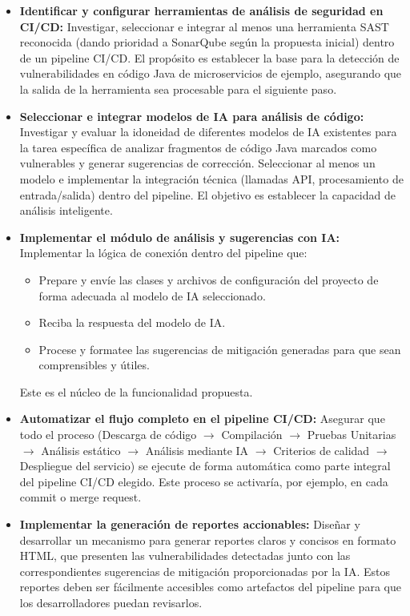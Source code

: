 \begin{itemize}
    \item \textbf{Identificar y configurar herramientas de análisis de seguridad en CI/CD:} Investigar, seleccionar e integrar al menos una herramienta SAST reconocida (dando prioridad a SonarQube según la propuesta inicial) dentro de un pipeline CI/CD. El propósito es establecer la base para la detección de vulnerabilidades en código Java de microservicios de ejemplo, asegurando que la salida de la herramienta sea procesable para el siguiente paso.
    
    \item \textbf{Seleccionar e integrar modelos de IA para análisis de código:} Investigar y evaluar la idoneidad de diferentes modelos de IA existentes para la tarea específica de analizar fragmentos de código Java marcados como vulnerables y generar sugerencias de corrección. Seleccionar al menos un modelo e implementar la integración técnica (llamadas API, procesamiento de entrada/salida) dentro del pipeline. El objetivo es establecer la capacidad de análisis inteligente.
    
    \item \textbf{Implementar el módulo de análisis y sugerencias con IA:} Implementar la lógica de conexión dentro del pipeline que:
    \begin{itemize}
        \item Prepare y envíe las clases y archivos de configuración del proyecto de forma adecuada al modelo de IA seleccionado.
        \item Reciba la respuesta del modelo de IA.
        \item Procese y formatee las sugerencias de mitigación generadas para que sean comprensibles y útiles.
    \end{itemize}
    Este es el núcleo de la funcionalidad propuesta.
    
    \item \textbf{Automatizar el flujo completo en el pipeline CI/CD:} Asegurar que todo el proceso (Descarga de código $\rightarrow$ Compilación $\rightarrow$ Pruebas Unitarias $\rightarrow$ Análisis estático $\rightarrow$ Análisis mediante IA $\rightarrow$ Criterios de calidad $\rightarrow$ Despliegue del servicio) se ejecute de forma automática como parte integral del pipeline CI/CD elegido. Este proceso se activaría, por ejemplo, en cada commit o merge request.
    
    \item \textbf{Implementar la generación de reportes accionables:} Diseñar y desarrollar un mecanismo para generar reportes claros y concisos en formato HTML, que presenten las vulnerabilidades detectadas junto con las correspondientes sugerencias de mitigación proporcionadas por la IA. Estos reportes deben ser fácilmente accesibles como artefactos del pipeline para que los desarrolladores puedan revisarlos.
    

\end{itemize}

